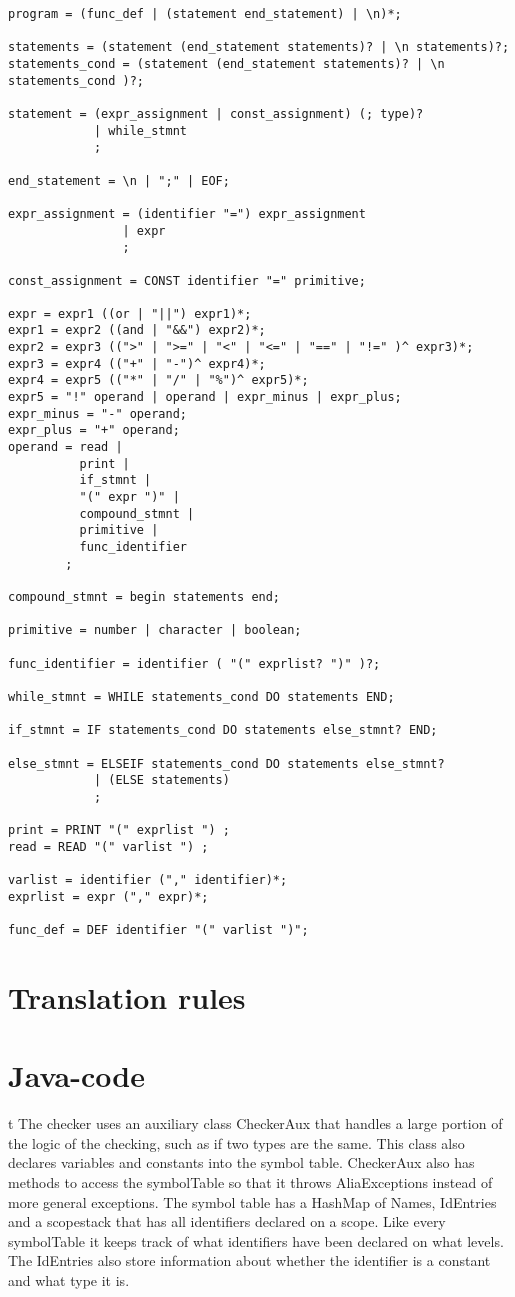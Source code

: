 \documentclass[paper=a4, fontsize=11pt]{article}
\numberwithin{equation}{section}		%
\numberwithin{figure}{section}			%
\numberwithin{table}{section}				%
\begin{document}
\begin{verbatim}
program = (func_def | (statement end_statement) | \n)*;

statements = (statement (end_statement statements)? | \n statements)?;
statements_cond = (statement (end_statement statements)? | \n statements_cond )?;

statement = (expr_assignment | const_assignment) (; type)?
			| while_stmnt 
			;

end_statement = \n | ";" | EOF;

expr_assignment = (identifier "=") expr_assignment
				| expr 
				;

const_assignment = CONST identifier "=" primitive;

expr = expr1 ((or | "||") expr1)*;
expr1 = expr2 ((and | "&&") expr2)*;
expr2 = expr3 ((">" | ">=" | "<" | "<=" | "==" | "!=" )^ expr3)*;
expr3 = expr4 (("+" | "-")^ expr4)*;
expr4 = expr5 (("*" | "/" | "%")^ expr5)*;
expr5 = "!" operand | operand | expr_minus | expr_plus;
expr_minus = "-" operand;
expr_plus = "+" operand;
operand = read |
	   	  print |
	   	  if_stmnt |
	   	  "(" expr ")" |
	   	  compound_stmnt |
	   	  primitive |
	   	  func_identifier
		;
		  
compound_stmnt = begin statements end;

primitive = number | character | boolean;

func_identifier = identifier ( "(" exprlist? ")" )?;

while_stmnt = WHILE statements_cond DO statements END;

if_stmnt = IF statements_cond DO statements else_stmnt? END;

else_stmnt = ELSEIF statements_cond DO statements else_stmnt?
			| (ELSE statements)
			;

print = PRINT "(" exprlist ") ;
read = READ "(" varlist ") ;

varlist = identifier ("," identifier)*;
exprlist = expr ("," expr)*;

func_def = DEF identifier "(" varlist ")";
\end{verbatim}

\section{Translation rules} %

\section{Java-code}t
The checker uses an auxiliary class CheckerAux that handles a large portion of the logic of the checking, such as if two types are the same. This class also declares variables and constants into the symbol table. CheckerAux also has methods to access the symbolTable so that it throws AliaExceptions instead of more general exceptions. The symbol table has a HashMap of Names, IdEntries and a scopestack that has all identifiers declared on a scope. Like every symbolTable it keeps track of what identifiers have been declared on what levels. The IdEntries also store information about whether the identifier is a constant and what type it is.
\end{document}
